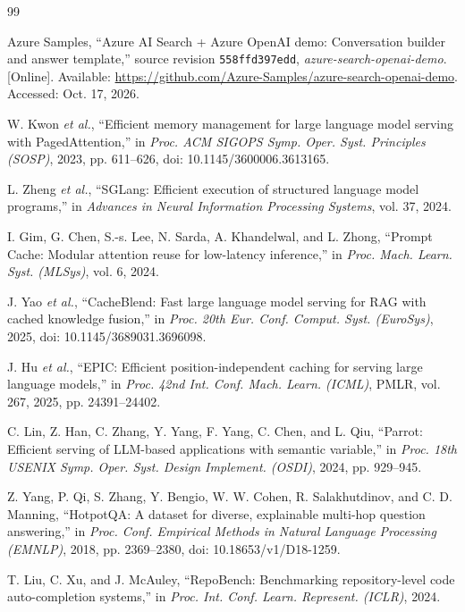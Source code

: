 \begin{thebibliography}{99}

Azure Samples, ``Azure AI Search + Azure OpenAI demo: Conversation builder and answer template,'' source revision \texttt{558ffd397edd}, \emph{azure-search-openai-demo}. [Online]. Available: \url{https://github.com/Azure-Samples/azure-search-openai-demo}. Accessed: Oct. 17, 2026.

W. Kwon \emph{et al.}, ``Efficient memory management for large language model serving with PagedAttention,'' in \emph{Proc. ACM SIGOPS Symp. Oper. Syst. Principles (SOSP)}, 2023, pp. 611--626, doi: 10.1145/3600006.3613165.

L. Zheng \emph{et al.}, ``SGLang: Efficient execution of structured language model programs,'' in \emph{Advances in Neural Information Processing Systems}, vol. 37, 2024.

I. Gim, G. Chen, S.-s. Lee, N. Sarda, A. Khandelwal, and L. Zhong, ``Prompt Cache: Modular attention reuse for low-latency inference,'' in \emph{Proc. Mach. Learn. Syst. (MLSys)}, vol. 6, 2024.

J. Yao \emph{et al.}, ``CacheBlend: Fast large language model serving for RAG with cached knowledge fusion,'' in \emph{Proc. 20th Eur. Conf. Comput. Syst. (EuroSys)}, 2025, doi: 10.1145/3689031.3696098.

J. Hu \emph{et al.}, ``EPIC: Efficient position-independent caching for serving large language models,'' in \emph{Proc. 42nd Int. Conf. Mach. Learn. (ICML)}, PMLR, vol. 267, 2025, pp. 24391--24402.

C. Lin, Z. Han, C. Zhang, Y. Yang, F. Yang, C. Chen, and L. Qiu, ``Parrot: Efficient serving of LLM-based applications with semantic variable,'' in \emph{Proc. 18th USENIX Symp. Oper. Syst. Design Implement. (OSDI)}, 2024, pp. 929--945.

Z. Yang, P. Qi, S. Zhang, Y. Bengio, W. W. Cohen, R. Salakhutdinov, and C. D. Manning, ``HotpotQA: A dataset for diverse, explainable multi-hop question answering,'' in \emph{Proc. Conf. Empirical Methods in Natural Language Processing (EMNLP)}, 2018, pp. 2369--2380, doi: 10.18653/v1/D18-1259.

T. Liu, C. Xu, and J. McAuley, ``RepoBench: Benchmarking repository-level code auto-completion systems,'' in \emph{Proc. Int. Conf. Learn. Represent. (ICLR)}, 2024.


\end{thebibliography}
